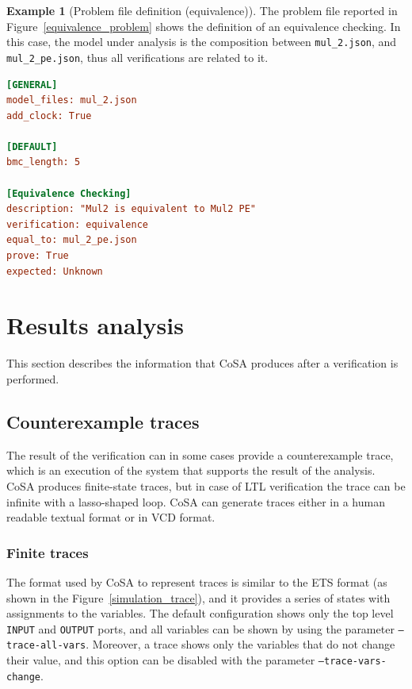 \documentclass{article}
\theoremstyle{definition}
\newtheorem{example}{Example}[section]
\begin{document}
\begin{example}[Problem file definition (equivalence)]
The problem file reported in Figure~\ref{equivalence_problem} shows
the definition of an equivalence checking. In this case, the model
under analysis is the composition between \texttt{mul\_2.json}, and
\texttt{mul\_2\_pe.json}, thus all verifications are related to it.
  
\begin{lstlisting}[frame=single,language=Ini,caption=Problem file in \texttt{examples/mul\_2/problem\_1.txt},label=equivalence_problem]
[GENERAL]
model_files: mul_2.json
add_clock: True

[DEFAULT]
bmc_length: 5

[Equivalence Checking]
description: "Mul2 is equivalent to Mul2 PE"
verification: equivalence
equal_to: mul_2_pe.json
prove: True
expected: Unknown
\end{lstlisting}
\end{example}

\section{Results analysis}
\label{sec:results_analysis}

This section describes the information that CoSA produces after a
verification is performed.

\subsection{Counterexample traces}

The result of the verification can in some cases provide a
counterexample trace, which is an execution of the system that
supports the result of the analysis. CoSA produces finite-state
traces, but in case of LTL verification the trace can be infinite with
a lasso-shaped loop. CoSA can generate traces either in a human
readable textual format or in VCD format.

\subsubsection{Finite traces}

The format used by CoSA to represent traces is similar to the ETS
format (as shown in the Figure~\ref{simulation_trace}), and it
provides a series of states with assignments to the variables. The
default configuration shows only the top level \texttt{INPUT} and
\texttt{OUTPUT} ports, and all variables can be shown by using the
parameter \texttt{--trace-all-vars}. Moreover, a trace shows only the
variables that do not change their value, and this option can be
disabled with the parameter \texttt{--trace-vars-change}.
\end{document}
